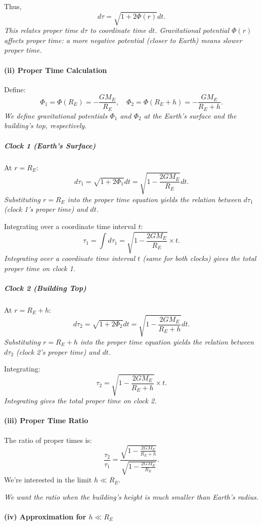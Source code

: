 \documentclass{article}
\begin{document}
Thus,
\[
d\tau = \sqrt{1 + 2\Phi(r)} dt.
\]
\textit{This relates proper time $d\tau$ to coordinate time $dt$. Gravitational potential $\Phi(r)$ affects proper time: a more negative potential (closer to Earth) means slower proper time.}

\paragraph{(ii) Proper Time Calculation}

Define:
\[
\Phi_1 = \Phi(R_E) = -\frac{GM_E}{R_E}, \quad \Phi_2 = \Phi(R_E + h) = -\frac{GM_E}{R_E + h}.
\]
\textit{We define gravitational potentials $\Phi_1$ and $\Phi_2$ at the Earth's surface and the building's top, respectively.}

\subparagraph{Clock 1 (Earth's Surface)}

At $r = R_E$:
\[
d\tau_1 = \sqrt{1 + 2\Phi_1} dt = \sqrt{1 - \frac{2GM_E}{R_E}} dt.
\]
\textit{Substituting $r = R_E$ into the proper time equation yields the relation between $d\tau_1$ (clock 1's proper time) and $dt$.}

Integrating over a coordinate time interval $t$:
\[
\tau_1 = \int d\tau_1 = \sqrt{1 - \frac{2GM_E}{R_E}} \times t.
\]
\textit{Integrating over a coordinate time interval $t$ (same for both clocks) gives the total proper time on clock 1.}

\subparagraph{Clock 2 (Building Top)}

At $r = R_E + h$:
\[
d\tau_2 = \sqrt{1 + 2\Phi_2} dt = \sqrt{1 - \frac{2GM_E}{R_E + h}} dt.
\]
\textit{Substituting $r = R_E + h$ into the proper time equation yields the relation between $d\tau_2$ (clock 2's proper time) and $dt$.}

Integrating:
\[
\tau_2 = \sqrt{1 - \frac{2GM_E}{R_E + h}} \times t.
\]
\textit{Integrating gives the total proper time on clock 2.}

\paragraph{(iii) Proper Time Ratio}

The ratio of proper times is:
\[
\frac{\tau_2}{\tau_1} = \frac{\sqrt{1 - \frac{2GM_E}{R_E + h}}}{\sqrt{1 - \frac{2GM_E}{R_E}}}.
\]
We're interested in the limit $h \ll R_E$.

\textit{We want the ratio when the building's height is much smaller than Earth's radius.}

\paragraph{(iv) Approximation for \(h \ll R_E\)}
\end{document}
